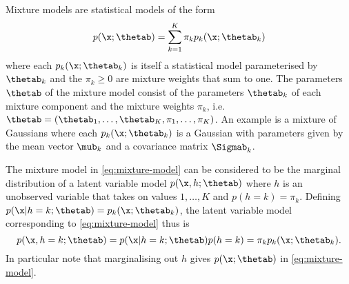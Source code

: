 \label{ex:EM-mixture-models}
Mixture models are statistical models of the form
\begin{equation}
  p(\x; \thetab) = \sum_{k=1}^K \pi_k p_k(\x; \thetab_k)
  \label{eq:mixture-model}
\end{equation}
where each $p_k(\x; \thetab_k)$ is itself a statistical model parameterised by
$\thetab_k$ and the $\pi_k\ge 0$ are mixture weights that sum to one. The
parameters $\thetab$ of the mixture model consist of the parameters $\thetab_k$
of each mixture component and the mixture weights $\pi_k$, i.e.\ $\thetab =
(\thetab_1, \ldots, \thetab_K, \pi_1, \ldots, \pi_K)$. An example is a mixture
of Gaussians where each $p_k(\x; \thetab_k)$ is a Gaussian with parameters given
by the mean vector $\mub_k$ and a covariance matrix $\Sigmab_k$.

The mixture model in \eqref{eq:mixture-model} can be considered to be the
marginal distribution of a latent variable model $p(\x, h; \thetab)$ where $h$
is an unobserved variable that takes on values $1, \ldots, K$ and $p(h=k) =
\pi_k$. Defining $p(\x|h=k; \thetab) = p_k(\x; \thetab_k)$, the latent variable
model corresponding to \eqref{eq:mixture-model} thus is
\begin{equation}
  p(\x, h=k; \thetab) = p(\x|h=k; \thetab)p(h=k) = \pi_k p_k(\x; \thetab_k).
  \label{eq:latent-var-model-long}
\end{equation}
In particular note that marginalising out $h$ gives $p(\x; \thetab)$ in
\eqref{eq:mixture-model}.

